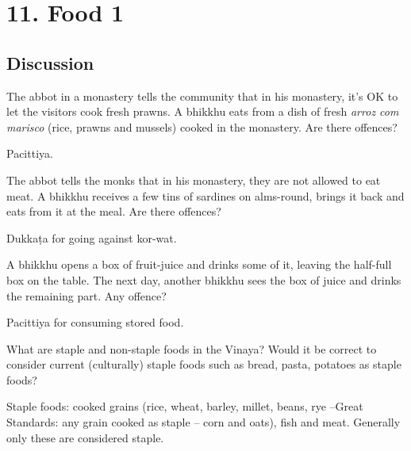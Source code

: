 \chapter{11. Food 1}
\renewcommand*{\theChapterTitle}{11. Food 1}

\section*{Discussion}

The abbot in a monastery tells the community that in his monastery, it's OK to let the visitors cook fresh prawns.
A bhikkhu eats from a dish of fresh \emph{arroz com marisco} (rice, prawns and mussels) cooked in the monastery.
Are there offences?

\begin{solution}
  Pacittiya.
\end{solution}

\bigskip
    
The abbot tells the monks that in his monastery, they are not allowed to eat meat.
A bhikkhu receives a few tins of sardines on alms-round, brings it back and eats from it at the meal.
Are there offences?

\begin{solution}
  Dukkaṭa for going against kor-wat.
\end{solution}

\bigskip

A bhikkhu opens a box of fruit-juice and drinks some of it, leaving the
half-full box on the table. The next day, another bhikkhu sees the box of juice
and drinks the remaining part. Any offence?

\begin{solution}
  Pacittiya for consuming stored food.
\end{solution}

\bigskip


What are staple and non-staple foods in the Vinaya?
Would it be correct to consider current (culturally) staple foods such as bread, pasta, potatoes as staple foods?

\begin{solution}
  Staple foods: cooked grains (rice, wheat, barley, millet, beans, rye –Great
  Standards: any grain cooked as staple – corn and oats), fish and meat. Generally
  only these are considered staple.
\end{solution}

